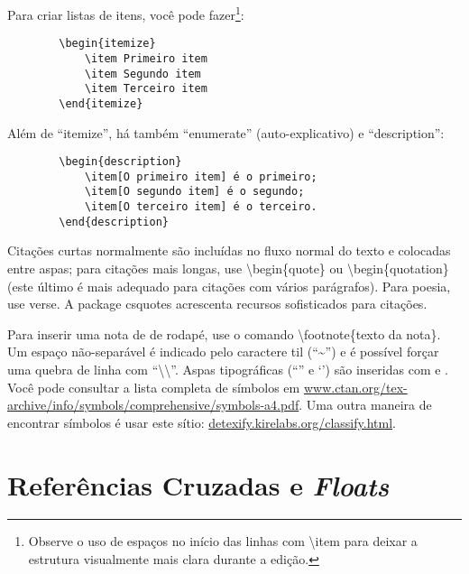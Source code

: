 Para criar listas de itens, você pode fazer\footnote{Observe o uso de
espaços no início das linhas com \textsf{\textbackslash{}item} para deixar a
estrutura visualmente mais clara durante a edição.}:

\begin{verbatim}
        \begin{itemize}
            \item Primeiro item
            \item Segundo item
            \item Terceiro item
        \end{itemize}
\end{verbatim}

Além de ``itemize'', há também ``enumerate'' (auto-explicativo) e ``description'':

\begin{verbatim}
        \begin{description}
            \item[O primeiro item] é o primeiro;
            \item[O segundo item] é o segundo;
            \item[O terceiro item] é o terceiro.
        \end{description}
\end{verbatim}

Citações curtas normalmente são incluídas no fluxo normal do texto e colocadas
entre aspas; para citações mais longas, use \textsf{\textbackslash{}begin\{quote\}}
ou \textsf{\textbackslash{}begin\{quotation\}} (este último é mais adequado
para citações com vários parágrafos). Para poesia, use \textsf{verse}. A
package \textsf{csquotes} acrescenta recursos sofisticados para citações.

Para inserir uma nota de de rodapé, use o comando
\textsf{\textbackslash{}footnote\{texto da nota\}}.
Um espaço não-separável é indicado pelo caractere til (``\textasciitilde{}'')
e é possível forçar uma quebra de linha com
``\textsf{\textbackslash{}\textbackslash{}}''. Aspas tipográficas (``'' e `')
são inseridas com
\textasciigrave\textasciigrave\textquotesingle\textquotesingle{} e
\textasciigrave\textquotesingle. Você pode consultar a lista completa de
símbolos em \url{www.ctan.org/tex-archive/info/symbols/comprehensive/symbols-a4.pdf}.
Uma outra maneira de encontrar símbolos é usar este sítio: \url{detexify.kirelabs.org/classify.html}.

\section{Referências Cruzadas e \emph{Floats}}

